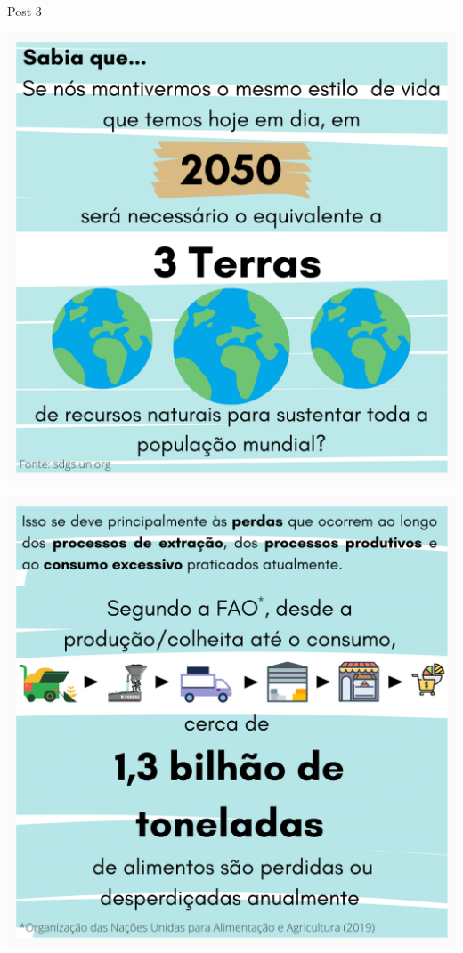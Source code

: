 \documentclass{beamer}
\begin{document}
	\begin{frame}{Post 3}
		\begin{minipage}{0.49\linewidth}
			\centering
			\includegraphics[width=\linewidth]{Post 3/1.png}
		\end{minipage}
		\hfill
		\begin{minipage}{0.49\linewidth}
			\centering
			\includegraphics[width=\linewidth]{Post 3/2.png}
		\end{minipage}
	\end{frame}
	
\end{document}
